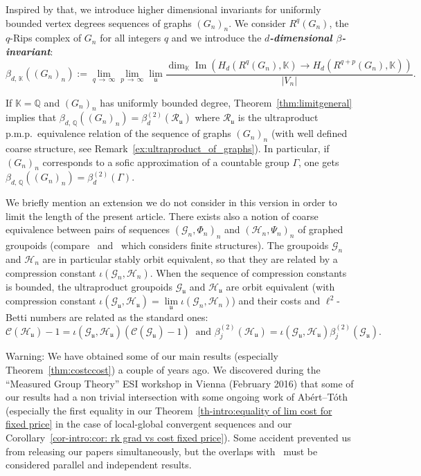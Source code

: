 \documentclass[AHL,Unicode,longabstracts,published]{cedram}
\newcommand{\defin}[1]{\textbf{\emph{#1}}}
\newcommand{\Qmath}{\mathbb{Q}}
\newcommand{\Kmath}{\mathbb{K}}
\newcommand{\RR}{\mathcal{R}}
\newcommand{\cost}{\mathcal{C}}
\newcommand{\ch}{\mathcal{H}}
\newcommand{\cg}{\mathcal{G}}
\DeclareMathOperator{\Ima}{Im}
\newcommand{\ul}{\mathfrak{u}}
\newcommand{\pmp}{p.m.p.\ }
\begin{document}
Inspired by that, we introduce higher dimensional invariants for uniformly bounded vertex degrees sequences of graphs $(G_n)_n$. We consider $R^q(G_n)$, the $q$-Rips complex of $G_n$ for all integers $q$ and we introduce the
\defin{$d$-dimensional $\beta$-invariant}:
\[
\beta_{d,\,\Kmath}((G_n)_n):=\lim_{q\,\to\,\infty}\lim_{p\,\to\,\infty} \lim_\ul \frac{\dim_\Kmath \Ima \left(H_d\left(R^{q}(G_n), \Kmath\right)\to H_d\left(R^{q+p}(G_n),\Kmath\right) \right)}{\vert V_n\vert}.
\]

If $\Kmath=\Qmath$ and $(G_n)_n$ has uniformly bounded degree, Theorem~\ref{thm:limitgeneral} implies that $\beta_{d,\,\mathbb{\Qmath}}((G_n)_n)=\beta_d^{(2)}(\RR_\ul)$ where $\RR_\ul$ is the ultraproduct \pmp equivalence relation of the sequence of graphs $(G_n)_n$ (with well defined coarse structure, see Remark~\ref{ex:ultraproduct_of_graphs}). In particular, if $(G_n)_n$ corresponds to a sofic approximation of a countable group $\Gamma$, one gets $\beta_{d,\,\mathbb{\Qmath}}((G_n)_n)=\beta_d^{(2)}(\Gamma)$.



We briefly mention an extension we do not consider in this version in order to limit the length of the present article. There exists also a notion of coarse equivalence between pairs of sequences $(\cg_n,\Phi_n)_n$ and $(\ch_n, \Psi_n)_n$ of graphed groupoids (compare~\cite{Alekseev-Finn-Sell-sofic-boundaries-2016} and~\cite{Kaiser-2017} which considers finite structures). The groupoids $\cg_n$ and $\ch_n$ are in particular stably orbit equivalent, so that they are related by a compression constant $\iota(\cg_n,\ch_n)$. When the sequence of compression constants is bounded, the ultraproduct groupoids $\cg_\ul$ and $\ch_\ul$ are orbit equivalent (with compression constant $\iota(\cg_\ul,\ch_\ul)=\lim\limits_{\ul} \iota(\cg_n,\ch_n)$) and their costs and $\ell^2$-Betti numbers are related as the standard ones:
\[
\cost(\ch_\ul)-1=\iota(\cg_\ul,\ch_\ul)(\cost(\cg_\ul)-1)\ \text{ and } \beta_j^{(2)}(\ch_\ul)=\iota(\cg_\ul,\ch_\ul) \beta_j^{(2)}(\cg_\ul).
\]





Warning: We have obtained some of our main results (especially Theorem~\ref{thm:costccost}) a couple of years ago. We discovered during the ``Measured Group Theory'' ESI workshop in Vienna (February 2016) that some of our results had a non trivial intersection with some ongoing work of Abért--Tóth (especially the first equality in our Theorem~\ref{th-intro:equality of lim cost for fixed price} in the case of local-global convergent sequences and our Corollary~\ref{cor-intro:cor: rk grad vs cost fixed price}). Some accident prevented us from releasing our papers simultaneously, but the overlaps with~\cite{Abert-Toth-unif-rk-grad-cost-loc-glob-cv} must be considered parallel and independent results.
\end{document}
